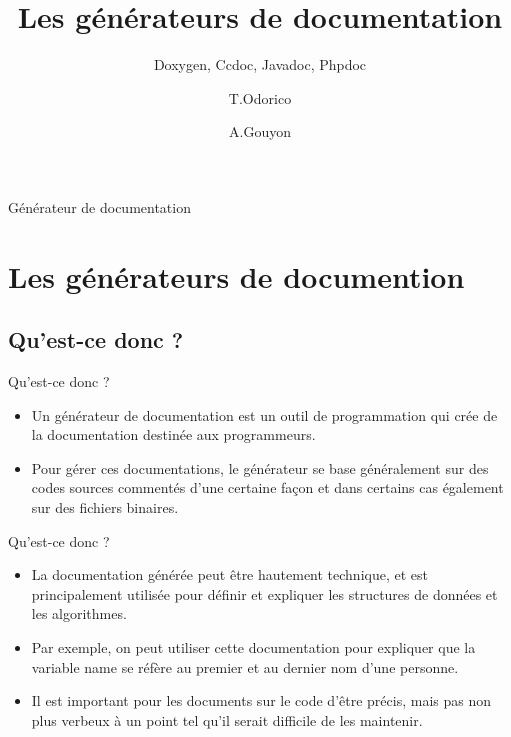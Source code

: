 \documentclass{beamer}
\title{Les générateurs de documentation}
\subtitle{Doxygen, Ccdoc, Javadoc, Phpdoc}
\author{T.Odorico \and A.Gouyon}
\institute[Université des sciences et des lettres] %
{
  
  Université des sciences et des lettres
  }
\begin{document}
\begin{frame}
  \titlepage
\end{frame}
\begin{frame}{Générateur de documentation}
  \tableofcontents

\end{frame}








\section{Les générateurs de documention}

\subsection{Qu'est-ce donc ?}

\begin{frame}{Qu'est-ce donc ?}
  \begin{itemize}
  \item {
   Un générateur de documentation est un outil de programmation qui crée de la documentation destinée aux programmeurs.
  }
  \item {
    Pour gérer ces documentations, le générateur se base généralement sur des codes sources commentés d'une certaine façon et dans certains cas également sur des fichiers binaires.
  }
  \end{itemize}
\end{frame}

\begin{frame}{Qu'est-ce donc ?}
  \begin{itemize}
  \item {
   La documentation générée peut être hautement technique, et est principalement utilisée pour définir et expliquer les structures de données et les algorithmes.
  }
  \item {
    Par exemple, on peut utiliser cette documentation pour expliquer que la variable name se réfère au premier et au dernier nom d'une personne. 
  }
  \item {
    Il est important pour les documents sur le code d'être précis, mais pas non plus verbeux à un point tel qu'il serait difficile de les maintenir. 
  }
  \end{itemize}
\end{frame}
\end{document}

